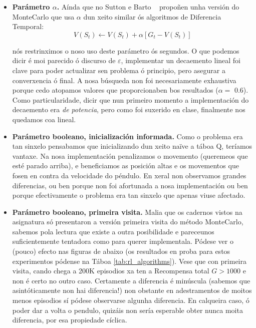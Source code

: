 \documentclass{article}
\begin{document}
\begin{itemize}
\begin{figure}[htbp]
\begin{minipage}{0.45\textwidth}
    \end{minipage}
\end{figure}

	\item \textbf{Parámetro $\alpha$.} Aínda que no Sutton e Barto \cite{Sutton1998}  propoñen unha versión do MonteCarlo que usa $\alpha$ dun xeito similar ós algoritmos de Diferencia Temporal:
			\[V(S_t)\leftarrow V(S_t)+\alpha[G_t -V(S_t)]\]

nós restrinximos o noso uso deste parámetro ós segundos. O que podemos dicir é moi parecido ó discurso de $\varepsilon$, implementar un decaemento lineal foi clave para poder actualizar sen problema ó principio, pero asegurar a converxencia ó final. A nosa búsqueda non foi necesariamente exhaustiva porque cedo atopamos valores que proporcionaben bos resultados ($\alpha =$ 0.6). Como particularidade, dicir que nun primeiro momento a implementación do decaemento era \emph{de potencia}, pero como foi suxerido en clase, finalmente nos quedamos coa lineal.

	\item \textbf{Parámetro booleano, inicialización informada.} Como o problema era tan sinxelo pensabamos que inicializando dun xeito naïve a táboa Q, teríamos vantaxe. Na nosa implementación penalizamos o movemento (queremeos que esté parado arriba), e beneficiamos as posición altas e os movementos que fosen en contra da velocidade do péndulo. En xeral non observamos grandes diferencias, ou ben porque non foi afortunada a nosa implementación ou ben porque efectivamente o problema era tan sinxelo que apenas viuse afectado.
	\item \textbf{Parámetro booleano, primeira visita.} Malia que os cadernos vistos na asignatura só presentaron a versión primeira visita do método MonteCarlo, sabemos pola lectura \cite{Sutton1998} que existe a outra posibilidade e pareceunos suficientemente tentadora como para querer implementala. Pódese ver o (pouco) efecto nas figuras de abaixo (os resultados en proba para estos experimentos pódense na Táboa \ref{tab:rl_algorithms}). Vese que con primeira visita, cando chega a 200K episodios xa ten a Recompensa total $G > 1000$ e non é certo no outro caso. Certamente a diferencia é minúscula (sabemos que asintóticamente non hai diferencia!) non obstante en adestramentos de moitos menos episodios sí pódese observarse algunha diferencia. En calqueira caso, ó poder dar a volta o pendulo, quizáis non sería esperable obter nunca moita diferencia, por esa propiedade cíclica.


\end{itemize}
\end{document}
